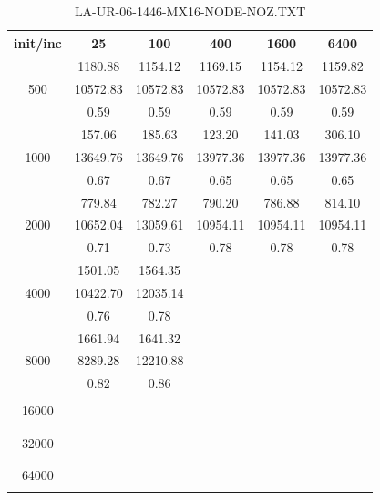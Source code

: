 {\begin{table}[th]
\caption{LA-UR-06-1446-MX16-NODE-NOZ.TXT}
\label{tab:LA-UR-06-1446-MX16-NODE-NOZ.TXT}
\centering
\begin{tabular}{|c||c|c|c|c|c|}
\hline
init/inc & 25 & 100 & 400 & 1600 & 6400 \\ \hline \hline
  & 1180.88 & 1154.12 & 1169.15 & 1154.12 & 1159.82\\ 
500  & 10572.83 & 10572.83 & 10572.83 & 10572.83 & 10572.83\\ 
  & 0.59 & 0.59 & 0.59 & 0.59 & 0.59\\ \hline 
  & 157.06 & 185.63 & 123.20 & 141.03 & 306.10\\ 
1000  & 13649.76 & 13649.76 & 13977.36 & 13977.36 & 13977.36\\ 
  & 0.67 & 0.67 & 0.65 & 0.65 & 0.65\\ \hline 
  & 779.84 & 782.27 & 790.20 & 786.88 & 814.10\\ 
2000  & 10652.04 & 13059.61 & 10954.11 & 10954.11 & 10954.11\\ 
  & 0.71 & 0.73 & 0.78 & 0.78 & 0.78\\ \hline 
  & 1501.05 & 1564.35 &  &  & \\ 
4000  & 10422.70 & 12035.14 &  &  & \\ 
  & 0.76 & 0.78 &  &  & \\ \hline 
  & 1661.94 & 1641.32 &  &  & \\ 
8000  & 8289.28 & 12210.88 &  &  & \\ 
  & 0.82 & 0.86 &  &  & \\ \hline 
  &  &  &  &  & \\ 
16000  &  &  &  &  & \\ 
  &  &  &  &  & \\ \hline 
  &  &  &  &  & \\ 
32000  &  &  &  &  & \\ 
  &  &  &  &  & \\ \hline 
  &  &  &  &  & \\ 
64000  &  &  &  &  & \\ 
  &  &  &  &  & \\ \hline 
\end{tabular}
\end{table}

}
